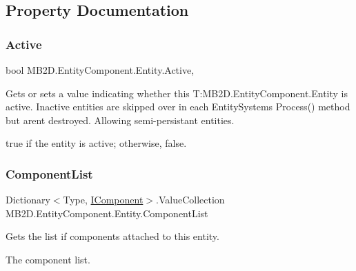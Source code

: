 \subsection{Property Documentation}
\hypertarget{class_m_b2_d_1_1_entity_component_1_1_entity_a3860df1e77b87727abd227e9e713a97b}{}\label{class_m_b2_d_1_1_entity_component_1_1_entity_a3860df1e77b87727abd227e9e713a97b} 
\subsubsection{\texorpdfstring{Active}{Active}}
{\footnotesize\ttfamily bool M\+B2\+D.\+Entity\+Component.\+Entity.\+Active\hspace{0.3cm}{\ttfamily [get]}, {\ttfamily [set]}}



Gets or sets a value indicating whether this T\+:\+M\+B2\+D.\+Entity\+Component.\+Entity is active. Inactive entities are skipped over in each Entity\+Systems Process() method but aren\textquotesingle{}t destroyed. Allowing semi-\/persistant entities. 

{\ttfamily true} if the entity is active; otherwise, {\ttfamily false}.\hypertarget{class_m_b2_d_1_1_entity_component_1_1_entity_ae15b38df98affb3a58dc53c4a1140f3e}{}\label{class_m_b2_d_1_1_entity_component_1_1_entity_ae15b38df98affb3a58dc53c4a1140f3e} 
\subsubsection{\texorpdfstring{Component\+List}{ComponentList}}
{\footnotesize\ttfamily Dictionary$<$Type, \hyperlink{interface_m_b2_d_1_1_entity_component_1_1_i_component}{I\+Component}$>$.Value\+Collection M\+B2\+D.\+Entity\+Component.\+Entity.\+Component\+List\hspace{0.3cm}{\ttfamily [get]}}



Gets the list if components attached to this entity. 

The component list.\hypertarget{class_m_b2_d_1_1_entity_component_1_1_entity_abd8ccf1511e8c825ee2574b3bc7af158}{}\label{class_m_b2_d_1_1_entity_component_1_1_entity_abd8ccf1511e8c825ee2574b3bc7af158} 
